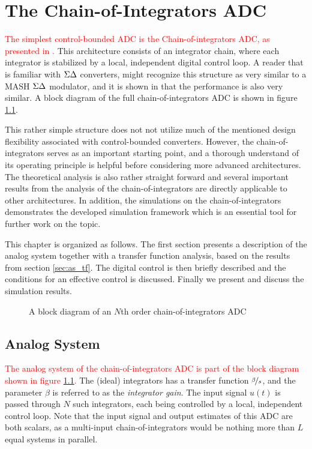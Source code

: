 
\chapter{The Chain-of-Integrators ADC}
\label{sec:ciadc}
\textcolor{red}{The simplest control-bounded ADC is the Chain-of-integrators ADC, as presented in \cite{cbc_2020_loeliger}.} This architecture consists of an integrator chain, where each integrator is stabilized by a local, independent digital control loop. A reader that is familiar with $\Sigma\Delta$ converters, might recognize this structure as very similar to a MASH $\Sigma\Delta$ modulator, and it is shown in \cite{malmberg_thesis} that the performance is also very similar. A block diagram of the full chain-of-integrators ADC is shown in figure \ref{fig:CI}.

This rather simple structure does not not utilize much of the mentioned design flexibility associated with control-bounded converters. However, the chain-of-integrators serves as an important starting point, and a thorough understand of its operating principle is helpful before considering more advanced architectures. The theoretical analysis is also rather straight forward and several important results from the analysis of the chain-of-integrators are directly applicable to other architectures. In addition, the simulations on the chain-of-integrators demonstrates the developed simulation framework which is an essential tool for further work on the topic.

This chapter is organized as follows. The first section presents a description of the analog system together with a transfer function analysis, based on the results from section \ref{sec:as_tf}. The digital control is then briefly described and the conditions for an effective control is discussed. Finally we present and discuss the simulation results.


\begin{figure}[hbp]
    \centering
    
    \caption{A block diagram of an $N$th order chain-of-integrators ADC}
    \label{fig:CI}
\end{figure}





\section{Analog System}
\textcolor{red}{The analog system of the chain-of-integrators ADC is part of the block diagram shown in figure \ref{fig:CI}.} The (ideal) integrators has a transfer function $\nicefrac{\beta}{s}$, and the parameter $\beta$ is referred to as the \textit{integrator gain}. The input signal $u(t)$ is passed through $N$ such integrators, each being controlled by a local, independent control loop. Note that the input signal and output estimates of this ADC are both scalars, as a multi-input chain-of-integrators would be nothing more than $L$ equal systems in parallel.

